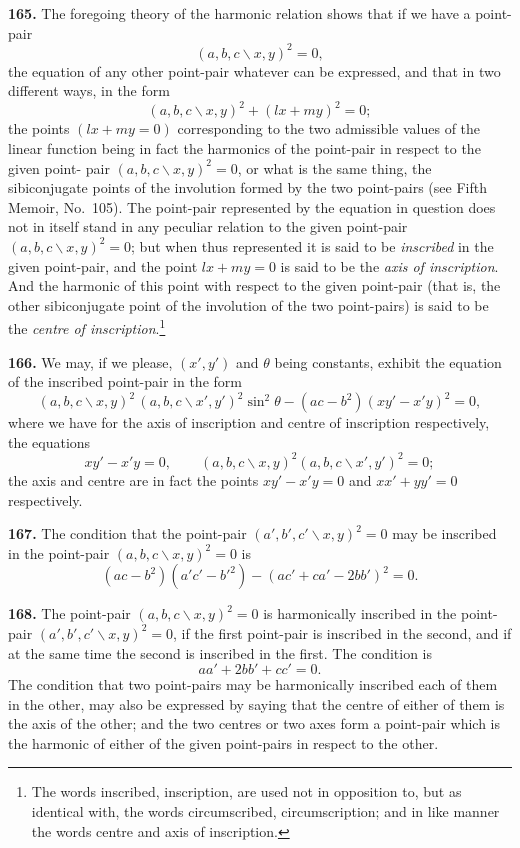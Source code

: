 \documentclass[11pt,a4paper]{book}
\begin{document}
\begin{center}
\textbf{165.} The foregoing theory of the harmonic relation shows that if we have a
point-pair
\[
(a,b,c\!\backslash x,y)^2=0,
\]
the equation of any other point-pair whatever can be expressed, and that in two
different ways, in the form
\[
(a,b,c\!\backslash x,y)^2+(lx+my)^2=0;
\]
the points $(lx+my=0)$ corresponding to the two admissible values of the linear
function being in fact the harmonics of the point-pair in respect to the given point-
pair $(a,b,c\!\backslash x,y)^2=0$, or what is the same thing, the sibiconjugate points of the
involution formed by the two point-pairs (see Fifth Memoir, No.~105). The point-pair
represented by the equation in question does not in itself stand in any peculiar
relation to the given point-pair $(a,b,c\!\backslash x,y)^2=0$; but when thus represented it is said
to be \textit{inscribed} in the given point-pair, and the point $lx+my=0$ is said to be the
\textit{axis of inscription}. And the harmonic of this point with respect to the given point-pair
(that is, the other sibiconjugate point of the involution of the two point-pairs) is said
to be the \textit{centre of inscription}.\footnote{The words inscribed, inscription, are used not in opposition to, but as identical with, the words circumscribed, circumscription; and in like manner the words centre and axis of inscription.}

\textbf{166.} We may, if we please, $(x',y')$ and $\theta$ being constants, exhibit the equation
of the inscribed point-pair in the form
\[
(a,b,c\!\backslash x,y)^2\,(a,b,c\!\backslash x',y')^2\sin^2\theta-(ac-b^2)(xy'-x'y)^2=0,
\]
where we have for the axis of inscription and centre of inscription respectively, the
equations
\[
xy'-x'y=0,\qquad (a,b,c\!\backslash x,y)^2\!(a,b,c\!\backslash x',y')^2=0;
\]
the axis and centre are in fact the points $xy'-x'y=0$ and
$xx'+yy'=0$ respectively.

\textbf{167.} The condition that the point-pair $(a',b',c'\!\backslash x,y)^2=0$ may be inscribed in
the point-pair $(a,b,c\!\backslash x,y)^2=0$ is
\[
(ac-b^2)(a'c'-b'^2) - (ac'+ca'-2bb')^2 = 0.
\]

\textbf{168.} The point-pair $(a,b,c\!\backslash x,y)^2=0$ is harmonically inscribed in the point-
pair $(a',b',c'\!\backslash x,y)^2=0$, if the first point-pair is inscribed in the second, and if at the
same time the second is inscribed in the first. The condition is
\[
aa'+2bb'+cc'=0.
\]
The condition that two point-pairs may be harmonically inscribed each of them in
the other, may also be expressed by saying that the centre of either of them is the
axis of the other; and the two centres or two axes form a point-pair which is the
harmonic of either of the given point-pairs in respect to the other.


\end{center}
\end{document}
